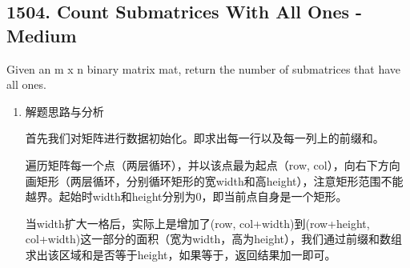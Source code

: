 \documentclass[9pt, b5paaper]{book}
\begin{document}
\subsection{1504. Count Submatrices With All Ones - Medium}
\label{sec-1-5-4}
Given an m x n binary matrix mat, return the number of submatrices that have all ones.
\begin{enumerate}
\item 解题思路与分析
\label{sec-1-5-4-1}

首先我们对矩阵进行数据初始化。即求出每一行以及每一列上的前缀和。

遍历矩阵每一个点（两层循环），并以该点最为起点（row, col），向右下方向画矩形（两层循环，分别循环矩形的宽width和高height），注意矩形范围不能越界。起始时width和height分别为0，即当前点自身是一个矩形。

当width扩大一格后，实际上是增加了(row, col+width)到(row+height, col+width)这一部分的面积（宽为width，高为height），我们通过前缀和数组求出该区域和是否等于height，如果等于，返回结果加一即可。


\end{enumerate}
\end{document}
